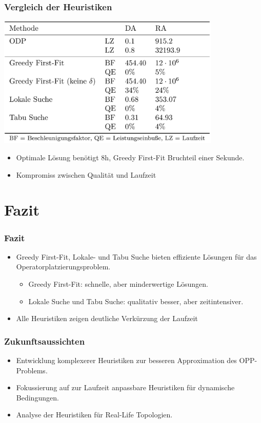 \documentclass{beamer}
\begin{document}
\begin{frame}
\frametitle{Vergleich der Heuristiken}

\begin{center}
    \includegraphics[width=0.8\textwidth]{res/evaluation.png} 
\end{center}

\begin{itemize}
    \item Optimale Lösung benötigt 8h, Greedy First-Fit Bruchteil einer Sekunde.
    \item Kompromiss zwischen Qualität und Laufzeit
\end{itemize}
\end{frame}

\section{Fazit}
\begin{frame}
\frametitle{Fazit}
\begin{itemize}
    \item Greedy First-Fit, Lokale- und Tabu Suche bieten effiziente Lösungen für das Operatorplatzierungsproblem.
    \begin{itemize}
        \item Greedy First-Fit: schnelle, aber minderwertige Lösungen.
        \item Lokale Suche und Tabu Suche: qualitativ besser, aber zeitintensiver.
    \end{itemize}
    \item Alle Heuristiken zeigen deutliche Verkürzung der Laufzeit
\end{itemize}
\end{frame}

\begin{frame}
\frametitle{Zukunftsaussichten}
\begin{itemize}
    \item Entwicklung komplexerer Heuristiken zur besseren Approximation des OPP-Problems.
    \item Fokussierung auf zur Laufzeit anpassbare Heuristiken für dynamische Bedingungen.
    \item Analyse der Heuristiken für Real-Life Topologien.
\end{itemize}
\end{frame}
\end{document}
